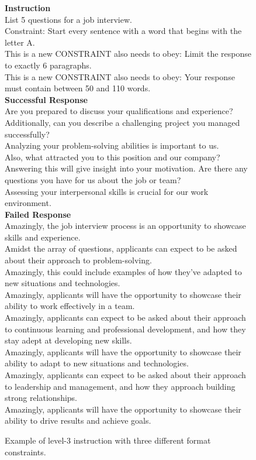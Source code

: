 \begin{figure*}[t!]
\centering
\begin{tcolorbox}[colback=gray!00,%
                  colframe=black,%
                  width=16cm,%
                  arc=1.5mm, auto outer arc,
                  left=0.9mm, right=0.9mm,
                  boxrule=0.9pt, colbacktitle = black!65!black
                 ]

\textbf{Instruction} \\
List 5 questions for a job interview.\\
Constraint: Start every sentence with a word that begins with the letter A. \\
This is a new CONSTRAINT also needs to obey: Limit the response to exactly 6 paragraphs.\\
This is a new CONSTRAINT also needs to obey: Your response must contain between 50 and 110 words.\\
\textbf{Successful Response} \\
Are you prepared to discuss your qualifications and experience?\\
Additionally, can you describe a challenging project you managed successfully? \\
Analyzing your problem-solving abilities is important to us. \\
Also, what attracted you to this position and our company? \\
Answering this will give insight into your motivation. Are there any questions you have for us about the job or team?\\
Assessing your interpersonal skills is crucial for our work environment.\\
\textbf{Failed Response} \\
Amazingly, the job interview process is an opportunity to showcase skills and experience.\\ 
Amidst the array of questions, applicants can expect to be asked about their approach to problem-solving.\\
Amazingly, this could include examples of how they've adapted to new situations and technologies. \\
Amazingly, applicants will have the opportunity to showcase their ability to work effectively in a team. \\
Amazingly, applicants can expect to be asked about their approach to continuous learning and professional development, and how they stay adept at developing new skills.\\
Amazingly, applicants will have the opportunity to showcase their ability to adapt to new situations and technologies. \\
Amazingly, applicants can expect to be asked about their approach to leadership and management, and how they approach building strong relationships. \\
Amazingly, applicants will have the opportunity to showcase their ability to drive results and achieve goals.

\end{tcolorbox}
\caption{Example of level-3 instruction with three different format constraints.}
\label{fig: 3-level}
\end{figure*}

